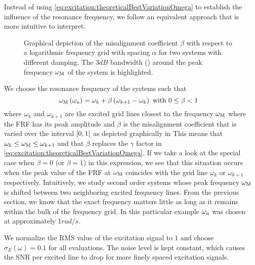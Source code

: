   Instead of using \eqref{eq:excitation:theoreticalBestVariationOmega} to establish the influence of the resonance frequency, we follow an equivalent approach that is more intuitive to interpret.

  \begin{figure}
    \centering
      \setlength{}
      \setlength\figureheight{0.5\figurewidth}
    
    \caption[Depiction of the grid misalignment $\beta$ for a logarithmic generalized multisine.]{Graphical depiction of the misalignment coefficient $\beta$ with respect to a logarithmic frequency grid with spacing $\alpha$ for two systems with different damping.
    The $3\unit{dB}$ bandwidth (\sysBW) around the peak frequency $\omega_{\mathrm{M}}$ of the system is highlighted.}
    \label{fig:excitation:misalignment-logms}
  \end{figure}


  We choose the resonance frequency of the systems such that
  \begin{equation}
   \omega_{\mathrm{M}}\left( \omega_{\mathrm{n}} \right)  = \omega_k + \beta \left( \omega_{k+1} - \omega_k \right)
   \text{ with } 0 \leq \beta < 1
   \label{eq:excitation:chosenVariationOmega}
  \end{equation}
  where $\omega_k$ and $\omega_{k+1}$ are the excited grid lines closest to the frequency $\omega_{\mathrm{M}}$ where the FRF has its peak amplitude and $\beta$ is the misalignment coefficient that is varied over the interval $\left[ 0,1 \right[$ as depicted graphically in 
  This means that $\omega_k \leq \omega_{\mathrm{M}} \leq \omega_{k+1}$ and that $\beta$ replaces the $\gamma$ factor in \eqref{eq:excitation:theoreticalBestVariationOmega}.
  If we take a look at the special case when $\beta=0$ (or $\beta=1$) in this expression, we see that this situation occurs when the peak value of the \gls{FRF} at $\omega_{\mathrm{M}}$ coincides with the grid line $\omega_k$ or $\omega_{k+1}$ respectively.
  Intuitively, we study second order systems whose peak frequency $\omega_{\mathrm{M}}$ is shifted between two neighboring excited frequency lines.
  From the previous section, we know that the exact frequency matters little as long as it remains within the bulk of the frequency grid.
  In this particular example $\omega_{\mathrm{n}}$ was chosen at approximately $1 \unit{rad/s}$.

  We normalize the \gls{RMS} value of the excitation signal to $1$ and choose $\sigma_E\left( \omega \right) = 0.1$ for all evaluations.
  The noise level is kept constant, which causes the \gls{SNR} per excited line to drop for more finely spaced excitation signals.
  
